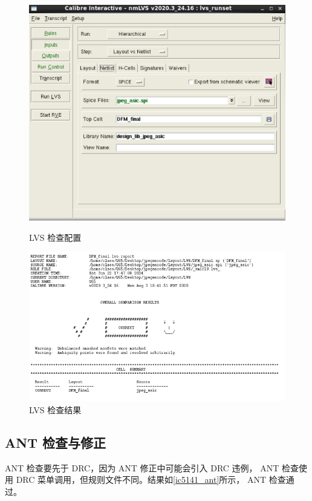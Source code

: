 \documentclass[12pt,hyperref,a4paper,UTF8]{ctexart}
\begin{document}
\begin{figure}[htbp]
    \centering
    \begin{minipage}{0.4\textwidth}
        \centering
        \includegraphics[width =1\textwidth]{figures/lvs_config.png}
        \caption{LVS 检查配置}
        \label{ic5141_lvs}
    \end{minipage}
    \quad
    \begin{minipage}{0.5\textwidth}
        \centering
        \includegraphics[width =1\textwidth]{figures/lvs_result.png}
        \caption{LVS 检查结果}
        \label{ic5141_lvs_res}
    \end{minipage}
\end{figure}



\subsection{ANT 检查与修正}
ANT 检查要先于 DRC，因为 ANT 修正中可能会引入 DRC 违例，
ANT 检查使用 DRC 菜单调用，但规则文件不同。结果如\autoref{ic5141_ant}所示，
ANT 检查通过。
\end{document}

